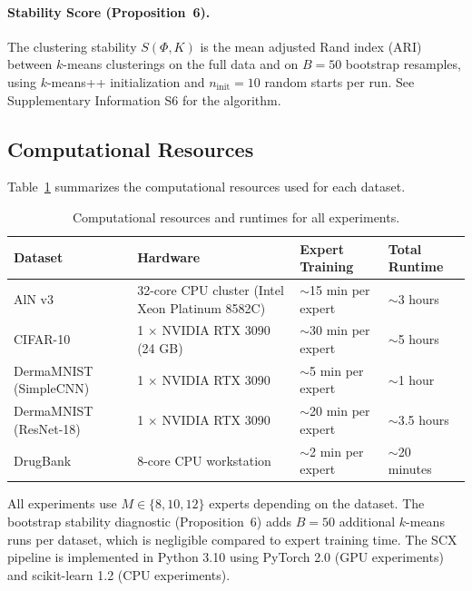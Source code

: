 \documentclass[article]{amsart}
\theoremstyle{definition}
\begin{document}
\paragraph{Stability Score (Proposition~6).}
The clustering stability $S(\Phi, K)$ is the mean adjusted Rand index (ARI) between $k$-means clusterings on the full data and on $B = 50$ bootstrap resamples, using $k$-means++ initialization and $n_{\text{init}} = 10$ random starts per run. See Supplementary Information S6 for the algorithm.

\subsection{Computational Resources}
\label{sec:compute}

Table~\ref{tab:compute} summarizes the computational resources used for each dataset.

\begin{table}[htbp]
\centering
\caption{Computational resources and runtimes for all experiments.}
\label{tab:compute}
\begin{tabular}{llll}
\toprule
Dataset & Hardware & Expert Training & Total Runtime \\
\midrule
AlN v3 & 32-core CPU cluster (Intel Xeon Platinum 8582C) & $\sim$15 min per expert & $\sim$3 hours \\
CIFAR-10 & 1 $\times$ NVIDIA RTX 3090 (24 GB) & $\sim$30 min per expert & $\sim$5 hours \\
DermaMNIST (SimpleCNN) & 1 $\times$ NVIDIA RTX 3090 & $\sim$5 min per expert & $\sim$1 hour \\
DermaMNIST (ResNet-18) & 1 $\times$ NVIDIA RTX 3090 & $\sim$20 min per expert & $\sim$3.5 hours \\
DrugBank & 8-core CPU workstation & $\sim$2 min per expert & $\sim$20 minutes \\
\bottomrule
\end{tabular}
\end{table}

All experiments use $M \in \{8, 10, 12\}$ experts depending on the dataset. The bootstrap stability diagnostic (Proposition~6) adds $B = 50$ additional $k$-means runs per dataset, which is negligible compared to expert training time. The SCX pipeline is implemented in Python 3.10 using PyTorch 2.0 (GPU experiments) and scikit-learn 1.2 (CPU experiments).
\end{document}
